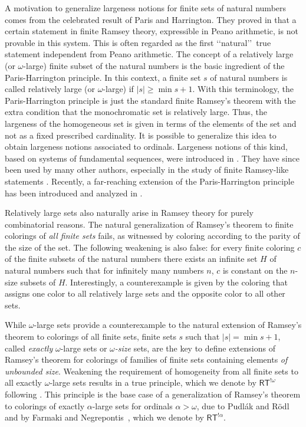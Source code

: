 \documentclass[11pt]{amsart}
\theoremstyle{definition}
\theoremstyle{remark}
\theoremstyle{plain}
\def\om{\omega}
\def\a{\alpha}
\newcommand{\RT}{\mathsf{RT}}
\begin{document}
A motivation to generalize largeness notions for finite sets of natural numbers comes from the celebrated result of Paris and Harrington. 
They proved in \cite{parisharrington} that a certain statement in finite Ramsey theory, expressible in Peano arithmetic, is not provable in this system.
This is often regarded as the first \lq\lq natural\rq\rq\ true statement independent from Peano arithmetic.
The concept of a relatively large (or $\omega$-large) finite subset of the natural numbers is the basic ingredient of the Paris-Harrington principle. 
In this context, a finite set $s$ of natural numbers is called relatively large (or $\omega$-large) if $|s| \geq \min s + 1$. 
With this terminology, the Paris-Harrington principle is just the standard finite Ramsey's theorem with the extra condition that the monochromatic set is relatively large. 
Thus, the largeness of the homogeneous set is given in terms of the elements of the set and not as a fixed prescribed cardinality. 
It is possible to generalize this idea to obtain largeness notions associated to ordinals. 
Largeness notions of this kind, based on systems of fundamental sequences,  were introduced in \cite{ketonensolovay}. 
They have since been used by many other authors, especially in the study of  finite Ramsey-like statements \cite{bigorajskaKotlarski1999, bigorajskaKotlarski2002, bigorajska2006, kotlarskiPiekartWeiermann2007, kotlarskiZdanowski2009}. 
Recently, a far-reaching extension of the Paris-Harrington principle has been introduced and analyzed in \cite{marcone2025}. 

Relatively large sets also naturally arise in Ramsey theory for purely combinatorial reasons. 
The natural generalization of Ramsey's theorem to finite colorings of {\em all finite sets} fails, as witnessed by coloring according to the parity of the size of the set.
The following weakening is also false: for every finite coloring $c$ of the finite subsets of the natural numbers there exists an infinite set $H$ of natural numbers such that for infinitely many numbers $n$, $c$ is constant on the $n$-size subsets of $H$. 
Interestingly, a counterexample is given by the coloring that assigns one color to all relatively large sets and the opposite color to all other sets.

While $\omega$-large sets provide a counterexample to the natural extension of Ramsey's theorem to colorings of all finite sets, finite sets $s$ such that $|s| = \min s +1$, called {\em exactly} $\omega$-large sets or {\em $\omega$-size} sets, are the key to define extensions of Ramsey's theorem for colorings of families of finite sets containing elements {\em of unbounded size}.
Weakening the requirement of homogeneity from all finite sets to all exactly $\omega$-large sets results in a true principle, which we denote by $\RT^{!\omega}$ following \cite{carlucci2014}. 
This principle is the base case of a generalization of Ramsey's theorem to colorings of exactly $\a$-large sets for ordinals $\a > \om$, due to Pudl\'ak and R\"{o}dl~\cite{Pud-Rod:82} and by Farmaki and Negrepontis~\cite{Far-Neg:08}, which we denote by $\RT^{!\a}$. 
\end{document}
